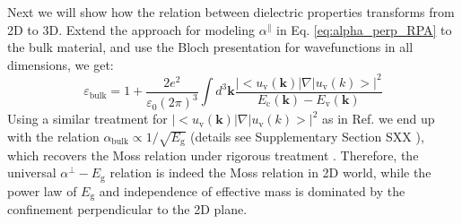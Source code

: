 \documentclass[journal=ancac3,manuscript=article,email=true,hyperref=true,keywords=false]{achemso}
\begin{document}
Next we will show how the relation between dielectric properties
transforms from 2D to 3D. Extend the approach for modeling
$\alpha^{\parallel}$ in Eq. \ref{eq:alpha_perp_RPA} to the bulk
material, and use the Bloch presentation for wavefunctions in all
dimensions, we get:
\begin{equation}
  \label{eq:alpha-Eg-3D}
  \varepsilon_{\mathrm{bulk}} = 1 + \frac{2e^{2}}{\varepsilon_{0}(2\pi)^{3}}\int d^{3}\mathbf{k}
  \frac{|<u_{\mathrm{v}}(\mathbf{k})|\nabla|u_{\mathrm{v}}(k)>|^{2}}
  {E_{\mathrm{c}}(\mathbf{k}) - E_{\mathrm{v}}(\mathbf{k})}
\end{equation}
Using a similar treatment for
$|<u_{\mathrm{v}}(\mathbf{k})|\nabla|u_{\mathrm{v}}(k)>|^{2}$ as in
Ref.  we end up with the relation
$\alpha_{\mathrm{bulk}} \propto 1/\sqrt{E_{\mathrm{g}}}$ (details see
Supplementary Section SXX ), which recovers the Moss
relation under rigorous treatment \cite{Finkenrath_1988}. Therefore,
the universal $\alpha^{\perp}-E_{\mathrm{g}}$ relation is indeed the
Moss relation in 2D world, while the power law of $E_{\mathrm{g}}$ and
independence of effective mass is dominated by the confinement
perpendicular to the 2D plane.
\end{document}
